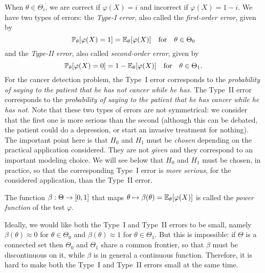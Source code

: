 When $\theta \in \Theta_i$, we are correct if $\varphi(X) = i$ and incorrect if $\varphi(X) = 1 - i$.
We have two types of errors: the \emph{Type-I error}, also called the \emph{first-order error}, given by 
\begin{equation}
	\label{eq:type-1-error}
	\mathbb P_\theta[ \varphi(X) = 1] = \mathbb E_\theta [\varphi(X)] \quad \text{for} \quad
	\theta \in \Theta_0
\end{equation}
and the \emph{Type-II error}, also called \emph{second-order error}, given by 
\begin{equation}
	\label{eq:type-2-error}
	\mathbb P_\theta[ \varphi(X) = 0] = 1 - \mathbb E_\theta [\varphi(X)] \quad \text{for} \quad 
	\theta \in \Theta_1.
\end{equation}
For the cancer detection problem, the Type~I error corresponds to the \emph{probability of saying to the patient that he has not cancer while he has.}
The Type~II error corresponds to the \emph{probability of saying to the patient that he has cancer while he has not}.
Note that these two types of errors are not symmetrical: we consider that the first one is more serious than the second (although this can be debated, the patient could do a depression, or start an invasive treatment for nothing).%
The important point here is that $H_0$ and $H_1$ must be \emph{chosen} depending on the practical application considered. 
They are not \emph{given} and they correspond to an important modeling choice.
We will see below that $H_0$ and $H_1$ must be chosen, in practice, so that the corresponding Type~I error is \emph{more serious}, for the considered application, than the Type~II error.
\begin{definition}
	\label{def:power-function}
	The function $\beta : \Theta \rightarrow [0, 1]$ that maps $\theta \mapsto \beta(\theta) = \mathbb E_\theta [\varphi(X)]$ is called the \emph{power function} of the test $\varphi$.
\end{definition}
Ideally, we would like both the Type~I and Type~II errors to be small, namely $\beta(\theta) \approx 0$ for $\theta \in \Theta_0$ and $\beta(\theta) \approx 1$ for $\theta \in \Theta_1$.
But this is impossible: if $\Theta$ is a connected set then $\Theta_0$ and $\Theta_1$ share a common frontier, so that $\beta$ must be discontinuous on it, while $\beta$ is in general a continuous function.
Therefore, it is hard to make both the Type~I and Type~II errors small at the same time.


